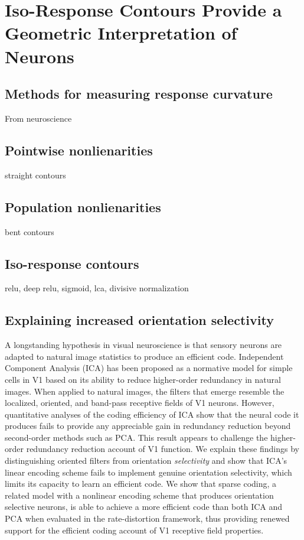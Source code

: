 \chapter{Iso-Response Contours Provide a Geometric Interpretation of Neurons}

\section{Methods for measuring response curvature}
From neuroscience

\section{Pointwise nonlienarities}
straight contours

\section{Population nonlienarities}
bent contours

\section{Iso-response contours}
relu, deep relu, sigmoid, lca, divisive normalization

\section{Explaining increased orientation selectivity}
A longstanding hypothesis in visual neuroscience is that sensory neurons are adapted to natural image statistics to produce an efficient code. Independent Component Analysis (ICA) has been proposed as a normative model for simple cells in V1 based on its ability to reduce higher-order redundancy in natural images. When applied to natural images, the filters that emerge resemble the localized, oriented, and band-pass receptive fields of V1 neurons. However, quantitative analyses of the coding efficiency of ICA show that the neural code it produces fails to provide any appreciable gain in redundancy reduction beyond second-order methods such as PCA. This result appears to challenge the higher-order redundancy reduction account of V1 function. We explain these findings by distinguishing oriented filters from orientation \textit{selectivity} and show that ICA's linear encoding scheme fails to implement genuine orientation selectivity, which limits its capacity to learn an efficient code. We show that sparse coding, a related model with a nonlinear encoding scheme that produces orientation selective neurons, is able to achieve a more efficient code than both ICA and PCA when evaluated in the rate-distortion framework, thus providing renewed support for the efficient coding account of V1 receptive field properties.

